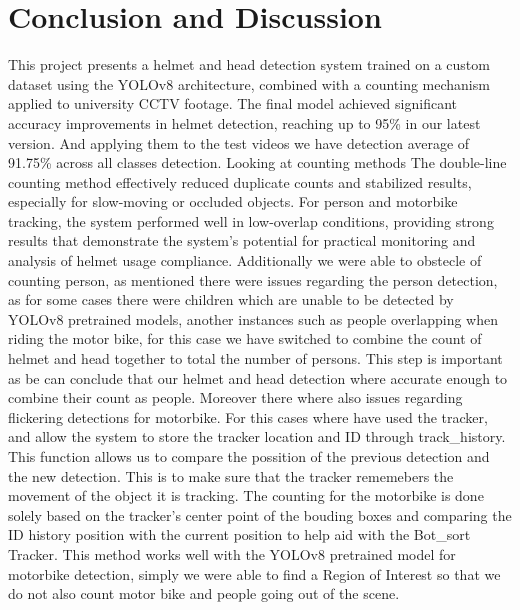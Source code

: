 \chapter{Conclusion and Discussion}
\setlength{\parindent}{2.5em}
This project presents a helmet and head detection system trained on a custom dataset using the YOLOv8 architecture, combined with a counting mechanism applied to university CCTV footage. The final model achieved significant accuracy improvements in helmet detection, reaching up to 95\% in our latest version. And applying them to the test videos we have detection average of 91.75\% across all classes detection. Looking at counting methods The double-line counting method effectively reduced duplicate counts and stabilized results, especially for slow-moving or occluded objects. For person and motorbike tracking, the system performed well in low-overlap conditions, providing strong results that demonstrate the system’s potential for practical monitoring and analysis of helmet usage compliance. Additionally we were able to obstecle of counting person, as mentioned there were issues regarding the person detection, as for some cases there were children which are unable to be detected by YOLOv8 pretrained models, another instances such as people overlapping when riding the motor bike, for this case we have switched to combine the count of helmet and head together to total the number of persons. This step is important as be can conclude that our helmet and head detection where accurate enough to combine their count as people. Moreover there where also issues regarding flickering detections for motorbike. For this cases where have used the tracker, and allow the system to store the tracker location and ID through track\_history. This function allows us to compare the possition of the previous detection and the new detection. This is to make sure that the tracker rememebers the movement of the object it is tracking. The counting for the motorbike is done solely based on the tracker's center point of the bouding boxes and comparing the ID history position with the current position to help aid with the Bot\_sort Tracker. This method works well with the YOLOv8 pretrained model for motorbike detection, simply we were able to find a Region of Interest so that we do not also count motor bike and people going out of the scene. 

